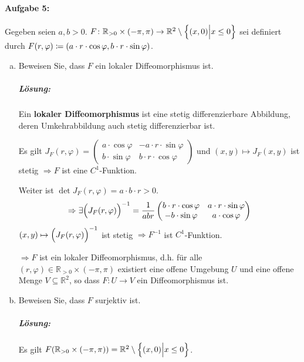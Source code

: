 \documentclass{scrreprt}
\begin{document}
\paragraph{Aufgabe 5:} Gegeben seien $a, b > 0$.
$F \colon \mathbb{R}_{> 0} \times \qty(-\pi, \pi) \to \mathbb{R}^2 \setminus \qty{(x, 0) {\Big |} x \leq 0}$
sei definiert durch $F(r, \varphi) \coloneqq \qty(a \cdot r \cdot \cos \varphi, b \cdot r \cdot \sin \varphi)$.
\begin{enumerate}[a)]
\item Beweisen Sie, dass $F$ ein lokaler Diffeomorphismus ist.

  \subparagraph{Lösung:} Ein \textbf{lokaler Diffeomorphismus} ist eine stetig
  differenzierbare Abbildung, deren Umkehrabbildung auch stetig differenzierbar
  ist.

  Es gilt $J_F(r, \varphi) = \begin{pmatrix}
    a \cdot \cos \varphi & -a \cdot r \cdot \sin \varphi \\
    b \cdot \sin \varphi & b \cdot r \cdot \cos \varphi
  \end{pmatrix}$ und $(x, y) \mapsto J_F(x, y)$ ist stetig
  $\Rightarrow F$ ist eine $C^1$-Funktion.

  Weiter ist $\det J_F (r, \varphi) = a \cdot b \cdot r > 0$.
  \[
    \Rightarrow \exists \qty\Big(J_F(r, \varphi))^{-1}
    = \frac{1}{abr} \begin{pmatrix}
      b \cdot r \cdot \cos \varphi & a \cdot r \cdot \sin \varphi \\
      -b \cdot \sin \varphi & a \cdot \cos \varphi
    \end{pmatrix}
  \]
  $(x, y) \mapsto \qty\Big(J_F(r, \varphi))^{-1}$ ist stetig
  $\Rightarrow F^{-1}$ ist $C^1$-Funktion.

  $\Rightarrow F$ ist ein lokaler Diffeomorphismus, d.h. für alle
  $(r, \varphi) \in \mathbb{R}_{> 0} \times (-\pi, \pi)$ existiert eine
  offene Umgebung $U$ und eine offene Menge $V \subseteq \mathbb{R}^2$,
  so dass $F \colon U \to V$ ein Diffeomorphismus ist.

\item Beweisen Sie, dass $F$ surjektiv ist.

  \subparagraph{Lösung:} Es gilt $F(\mathbb{R}_{>0} \times (-\pi, \pi)) =
  \mathbb{R}^2 \setminus \qty{(x, 0) {\Big |} x \leq 0}$.


\end{enumerate}
\end{document}
